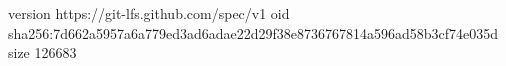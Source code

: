 version https://git-lfs.github.com/spec/v1
oid sha256:7d662a5957a6a779ed3ad6adae22d29f38e8736767814a596ad58b3cf74e035d
size 126683
